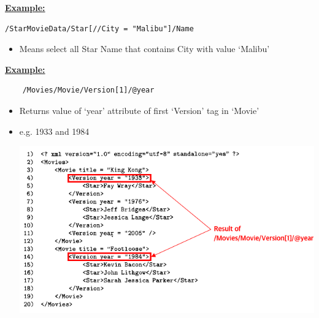 \documentclass[12pt]{article}
\begin{document}
\begin{enumerate}[1.]
\begin{enumerate}[a)]
\begin{itemize}
\begin{itemize}
                \bigskip

                \underline{\textbf{Example:}}

                \bigskip

    \begin{lstlisting}[language=XML]
    /StarMovieData/Star[//City = "Malibu"]/Name
    \end{lstlisting}

                \bigskip

                \begin{itemize}
                    \item Means select all Star Name that contains City with value `Malibu'
                \end{itemize}

                \bigskip

                \underline{\textbf{Example:}}

    \begin{lstlisting}
    /Movies/Movie/Version[1]/@year
    \end{lstlisting}

                \bigskip

                \begin{itemize}
                    \item Returns value of `year' attribute of first `Version' tag in `Movie'
                    \item e.g. 1933 and 1984

                    \bigskip

                    \begin{center}
                    \includegraphics[width=\linewidth]{images/worksheet_10_3.png}
                    \end{center}
                \end{itemize}


\end{itemize}
\end{itemize}
\end{enumerate}
\end{enumerate}
\end{document}
